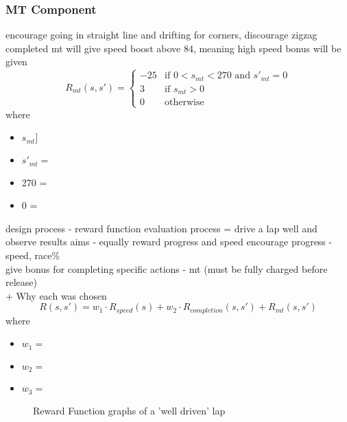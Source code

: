 \subsubsection{MT Component}
encourage going in straight line and drifting for corners, discourage zigzag\\ completed mt will give speed boost above 84, meaning high speed bonus will be given
\[
R_{mt}(s, s') = 
\begin{cases}
    -25&\text{if }0<s_{mt}<270\text{ and }s'_{mt} = 0\\
     3 &\text{if } s_{mt} > 0 \\
     0 & \text{otherwise}
\end{cases}
\]
where
\begin{itemize}
    \item $s_{mt}]$
    \item $s'_{mt}=$
    \item 270 = 
    \item 0 = 
\end{itemize}
design process - reward function evaluation process = drive a lap well and observe results
aims - equally reward progress and speed
encourage progress - speed, race\%
\\give bonus for completing specific actions - mt (must be fully charged before release)
\\ + Why each was chosen
\[
R(s,s') = w_1 \cdot R_{speed}(s) + w_2 \cdot R_{completion}(s,s') + R_{mt}(s,s')
\]
where
\begin{itemize}
    \item $w_1=$
    \item $w_2=$
    \item $w_3=$
\end{itemize}
\begin{figure}[ht]
    \centering
    \hfill
    \caption{Reward Function graphs of a 'well driven' lap}
\end{figure}

